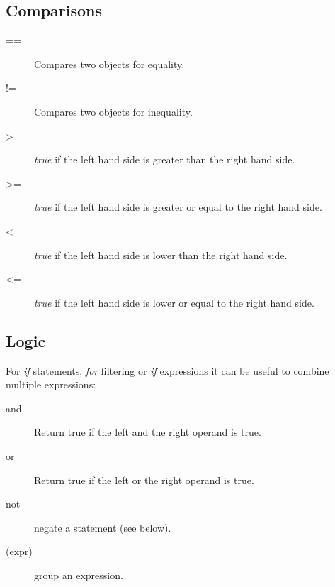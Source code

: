 \documentclass[a4paper,10pt,english]{sphinxmanual}
\begin{document}
\subsection{Comparisons}
\label{templates:comparisons}\begin{description}
\item[{==}] \leavevmode
Compares two objects for equality.

\item[{!=}] \leavevmode
Compares two objects for inequality.

\end{description}
\begin{description}
\item[{\textgreater{}}] \leavevmode
\emph{true} if the left hand side is greater than the right hand side.

\item[{\textgreater{}=}] \leavevmode
\emph{true} if the left hand side is greater or equal to the right hand side.

\end{description}
\begin{description}
\item[{\textless{}}] \leavevmode
\emph{true} if the left hand side is lower than the right hand side.

\item[{\textless{}=}] \leavevmode
\emph{true} if the left hand side is lower or equal to the right hand side.

\end{description}


\subsection{Logic}
\label{templates:logic}
For \emph{if} statements, \emph{for} filtering or \emph{if} expressions it can be useful to
combine multiple expressions:
\begin{description}
\item[{and}] \leavevmode
Return true if the left and the right operand is true.

\item[{or}] \leavevmode
Return true if the left or the right operand is true.

\item[{not}] \leavevmode
negate a statement (see below).

\item[{(expr)}] \leavevmode
group an expression.

\end{description}
\end{document}
